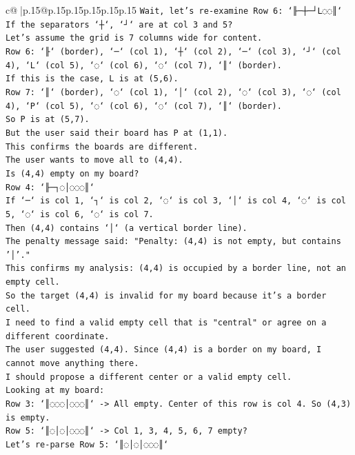 \documentclass{article}
\begin{document}
{\begin{supertabular}{c@{$\;$}|p{.15\linewidth}@{}p{.15\linewidth}p{.15\linewidth}p{.15\linewidth}p{.15\linewidth}p{.15\linewidth}}
{{{\texttt{Wait, let's re{-}examine Row 6: `╟─┼─┘L◌◌║`} \\
\texttt{If the separators `┼`, `┘` are at col 3 and 5?} \\
\texttt{Let's assume the grid is 7 columns wide for content.} \\
\texttt{Row 6: `╟` (border), `─` (col 1), `┼` (col 2), `─` (col 3), `┘` (col 4), `L` (col 5), `◌` (col 6), `◌` (col 7), `║` (border).} \\
\texttt{If this is the case, L is at (5,6).} \\
\texttt{Row 7: `║` (border), `◌` (col 1), `│` (col 2), `◌` (col 3), `◌` (col 4), `P` (col 5), `◌` (col 6), `◌` (col 7), `║` (border).} \\
\texttt{So P is at (5,7).} \\
\texttt{But the user said their board has P at (1,1).} \\
\texttt{This confirms the boards are different.} \\
\texttt{The user wants to move all to (4,4).} \\
\texttt{Is (4,4) empty on my board?} \\
\texttt{Row 4: `╟─┐◌│◌◌◌║`} \\
\texttt{If `─` is col 1, `┐` is col 2, `◌` is col 3, `│` is col 4, `◌` is col 5, `◌` is col 6, `◌` is col 7.} \\
\texttt{Then (4,4) contains `│` (a vertical border line).} \\
\texttt{The penalty message said: "Penalty: (4,4) is not empty, but contains '│'."} \\
\texttt{This confirms my analysis: (4,4) is occupied by a border line, not an empty cell.} \\
\texttt{So the target (4,4) is invalid for my board because it's a border cell.} \\
\texttt{I need to find a valid empty cell that is "central" or agree on a different coordinate.} \\
\texttt{The user suggested (4,4). Since (4,4) is a border on my board, I cannot move anything there.} \\
\texttt{I should propose a different center or a valid empty cell.} \\
\texttt{Looking at my board:} \\
\texttt{Row 3: `║◌◌◌│◌◌◌║` {-}> All empty. Center of this row is col 4. So (4,3) is empty.} \\
\texttt{Row 5: `║◌│◌│◌◌◌║` {-}> Col 1, 3, 4, 5, 6, 7 empty?} \\
\texttt{Let's re{-}parse Row 5: `║◌│◌│◌◌◌║`} \\
}}}
\end{supertabular}}
\end{document}
